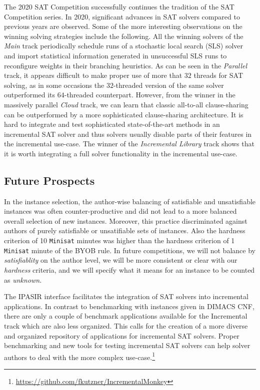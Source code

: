 \documentclass{elsarticle}
\newcommand{\solver}[1]{\texttt{#1}}
\begin{document}
The 2020 SAT Competition successfully continues the tradition of the SAT Competition series. In 2020, significant advances
in SAT solvers compared to previous years are observed. Some of the more interesting observations on the winning solving 
strategies include the following.
All the winning solvers of the \emph{Main} track periodically schedule runs of a stochastic local search (SLS)
solver and import statistical information generated in unsuccessful SLS runs to reconfigure weights in their branching heuristics. As can be seen in the \emph{Parallel} track, it appears difficult to make proper use of more that $32$ threads for SAT solving, as in some occasions the $32$-threaded version of the same solver outperformed its $64$-threaded counterpart. 
However, from the winner in the massively parallel \emph{Cloud} track, we can learn that classic all-to-all clause-sharing can be outperformed by a more sophisticated clause-sharing architecture. 
It is hard to integrate and test sophisticated state-of-the-art methods in an incremental SAT solver and thus solvers usually disable parts of their features in the incremental use-case. 
The winner of the \emph{Incremental Library} track shows that it is worth integrating a full solver functionality in the incremental use-case. 

\subsection*{Future Prospects}

In the instance selection, the author-wise balancing of satisfiable and unsatisfiable instances was often counter-productive and did not lead to a more balanced overall selection of new instances. 
Moreover, this practice discriminated against authors of purely satisfiable or unsatifiable sets of instances. 
Also the hardness criterion of 10 \solver{Minisat} minutes was higher than the hardness criterion of 1 \solver{Minisat} minute of the BYOB rule. 
In future competitions, we will not balance by \emph{satisfiablity} on the author level, we will be more consistent or clear with our \emph{hardness} criteria, and we will specify what it means for an instance to be counted as \emph{unknown}.

The IPASIR interface facilitates the integration of SAT solvers into incremental applications. 
In contrast to benchmarking with instances given in DIMACS CNF, there are only a couple of benchmark applications available for the Incremental track which are also less organized. 
This calls for the creation of a more diverse and organized repository of applications for incremental SAT solvers. 
Proper benchmarking and new tools for testing incremental SAT solvers can help solver authors to deal with the more complex use-case.\footnote{\url{https://github.com/fkutzner/IncrementalMonkey}} 
\end{document}
